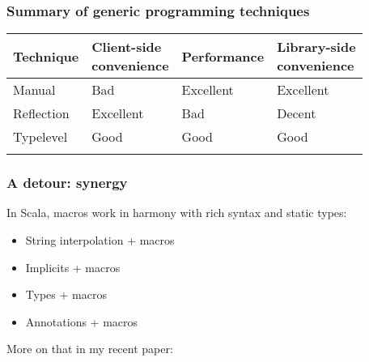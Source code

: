 \documentclass[svgnames,hyperref={bookmarks=false}]{beamer}
\begin{document}
\begin{frame}[fragile]
\frametitle{Summary of generic programming techniques}

{\tabulinesep=1.5mm
\begin{tabu}{ | p{2cm} | p{3cm} | p{2.5cm} | p{2.5cm} | }
  \hline
  Technique & \parbox{3cm}{Client-side \\ convenience} & Performance & \parbox{2.5cm}{Library-side \\ convenience} \\ \hline
  Manual & Bad & Excellent & Excellent \\ \hline
  Reflection & Excellent & Bad & Decent \\ \hline
  Typelevel & Good & Good & Good \\ \hline
   & \text{\color{blue}{Good}} & \text{\color{blue}{Excellent}} & \text{\color{blue}{Decent}} \\
  \hline
\end{tabu}}

\onslide
{}
\end{frame}

\begin{frame}[fragile]
\frametitle{}

\vskip40pt
\begin{center}
\end{center}
\end{frame}

\begin{frame}[fragile]
\frametitle{A detour: synergy}

In Scala, macros work in harmony with rich syntax and static types:
\begin{itemize}
\item String interpolation + macros
\item Implicits + macros
\item Types + macros
\item Annotations + macros
\end{itemize}

\vskip20pt
More on that in my recent paper:
\end{frame}
\end{document}
